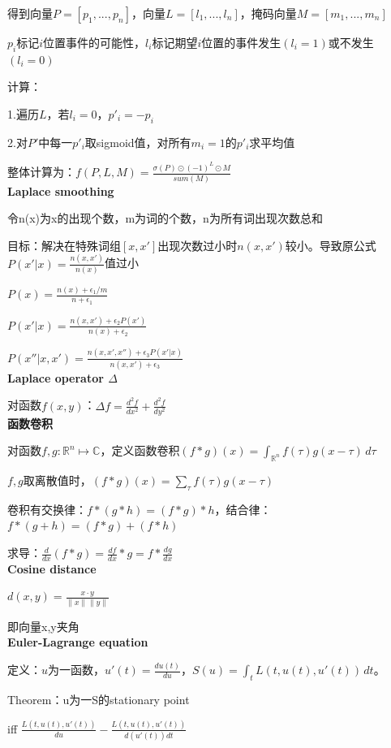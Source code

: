 \documentclass[UTF8]{ctexart}
\begin{document}
  得到向量$P = [p_1, ..., p_n]$，向量$L = [l_1, ..., l_n]$，掩码向量$M = [m_1, ..., m_n]$

  \quad $p_i$标记$i$位置事件的可能性，$l_i$标记期望$i$位置的事件发生$(l_i = 1)$或不发生$(l_i = 0)$

  计算：

  \quad 1.遍历$L$，若$l_i = 0$，$p'_i = -p_i$

  \quad 2.对$P'$中每一$p'_i$取sigmoid值，对所有$m_i = 1$的$p'_i$求平均值

  整体计算为：$f(P, L, M) = \frac{\sigma(P) \odot (-1)^L \odot M}{sum(M)}$\\
\textbf{Laplace smoothing}

  令n(x)为x的出现个数，m为词的个数，n为所有词出现次数总和
  
  \quad 目标：解决在特殊词组$[x, x']$出现次数过小时$n(x, x')$较小。导致原公式$P(x' | x) = \frac{n(x, x')}{n(x)}$值过小
    
  $P(x) = \frac{n(x) + \epsilon_1 / m}{n + \epsilon_1}$

  $P(x' | x) = \frac{n(x, x') + \epsilon_2 P(x')}{n(x) + \epsilon_2}$

  $P(x'' | x, x') = \frac{n(x, x', x'') + \epsilon_3 P(x' | x)}{n(x, x') + \epsilon_3}$\\
\textbf{Laplace operator $\Delta$}

  对函数$f(x, y)$：$\Delta f = \frac{d^2f}{dx^2} + \frac{d^2f}{dy^2}$\\
\textbf{函数卷积}

  对函数$f, g : \mathbb{R}^n \mapsto \mathbb{C}$，定义函数卷积$(f * g)(x) = \int_{\mathbb{R}^n} f(\tau)g(x - \tau) \,d\tau$

  \quad $f, g$取离散值时，$(f * g)(x) = \sum_\tau f(\tau)g(x - \tau)$

  卷积有交换律：$f * (g * h) = (f * g) * h$，结合律：$f * (g + h) = (f * g) + (f * h)$

  求导：$\frac{d }{dx}(f * g) = \frac{d f}{dx} * g = f * \frac{dg}{dx}$\\
\textbf{Cosine distance}

  $d(x, y) = \frac{x \cdot y}{\|x\|\|y\|}$

  即向量x,y夹角\\
\textbf{Euler-Lagrange equation}

  定义：$u$为一函数，$u'(t) = \frac{du(t)}{du}$，$S(u)= \int_{t} L(t, u(t), u'(t)) \,dt$。

  Theorem：u为一S的stationary point
  
  \quad iff $\frac{L(t, u(t), u'(t))}{du} - \frac{L(t, u(t), u'(t))}{d(u'(t))dt}$
\end{document}
